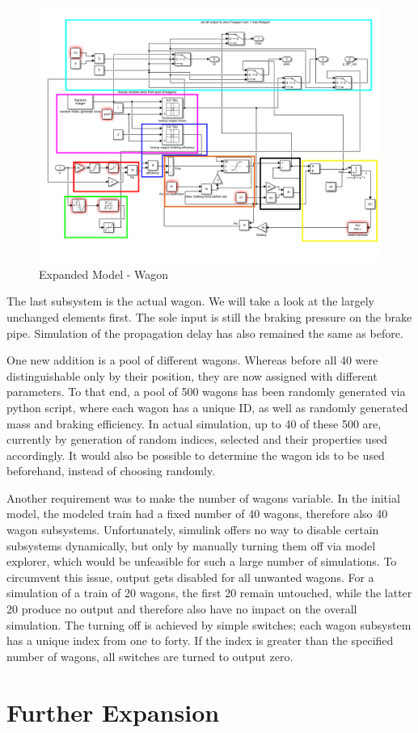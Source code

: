 \begin{figure}[H]
	\centering
	\includegraphics[width=\linewidth]{./pic/expandedmodel_wagon}
	\caption{Expanded Model - Wagon}
	\label{fig:expandedmodel_wagon}
\end{figure}

\par\noindent
The last subsystem is the actual wagon. We will take a look at the largely unchanged elements first. The sole input is still the braking pressure on the brake pipe. Simulation of the propagation delay has also remained the same as before. 

\par
One new addition is a pool of different wagons. Whereas before all 40 were distinguishable only by their position, they are now assigned with different parameters. To that end, a pool of 500 wagons has been randomly generated via python script, where each wagon has a unique ID, as well as randomly generated mass and braking efficiency. In actual simulation, up to 40 of these 500 are, currently by generation of random indices, selected and their properties used accordingly. It would also be possible to determine the wagon ids to be used beforehand, instead of choosing randomly.

\par
Another requirement was to make the number of wagons variable. In the initial model, the modeled train had a fixed number of 40 wagons, therefore also 40 wagon subsystems. Unfortunately, simulink offers no way to disable certain subsystems dynamically, but only by manually turning them off via model explorer, which would be unfeasible for such a large number of simulations. To circumvent this issue, output gets disabled for all unwanted wagons. For a simulation of a train of 20 wagons, the first 20 remain untouched, while the latter 20 produce no output and therefore also have no impact on the overall simulation. The turning off is achieved by simple switches; each wagon subsystem has a unique index from one to forty. If the index is greater than the specified number of wagons, all switches are turned to output zero.
	
\section{Further Expansion}
\label{sec:FurtherExpansion}